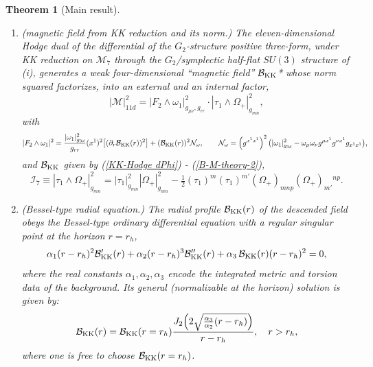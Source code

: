 \documentclass[a4paper,11pt,fleqn]{article}
\theoremstyle{plain}
\newtheorem{theorem}{Theorem}[section]
\theoremstyle{definition}
\newcommand{\Om}{\Omega}
\newcommand{\ta}{\tau}
\newcommand{\Nf}{{\cal B}_{\rm KK}(r)}
\newcommand{\gthree}{g_{3d}}
\newcommand{\grr}{g_{rr}}
\newcommand{\Ical}{\mathcal{I}_7}
\newcommand{\rh}{r_h}
\newcommand{\anu}{\alpha_1}
\newcommand{\ade}{\alpha_2}
\newcommand{\ath}{\alpha_3}
\begin{document}
\begin{theorem}[Main result]
\begin{enumerate}
\item[\textup{(ii)}] \emph{(magnetic field from KK reduction and its norm.)} The eleven-dimensional Hodge dual of the differential of the $G_2$-structure positive three-form, under KK reduction on $\mathcal{M}_7$ through the $G_2$/symplectic
half-flat $SU(3)$ structure of \textup{(i)}, generates a weak four-dimensional ``magnetic field'' ${\cal B}_{\rm KK}$* whose norm squared factorizes, into an external and an internal factor,
\begin{equation}
|\mathcal{M}|^2_{11d}
= |F_2\wedge\omega_1|^2_{g_{\mu\nu},\grr}\cdot
|\ta_1\wedge\Om_+|^2_{g_{mn}},
\label{eq:thm-normfact}
\end{equation}
with
\begin{equation}
|F_2\wedge\omega_1|^2
= \frac{|\omega_1|^2_{\gthree}}{\grr}(x^1)^2\bigl[(\partial_r\Nf)^2\bigr]
+ (\Nf)^2\mathcal{N}_\omega,
\qquad
\mathcal{N}_\omega = \left(g^{x^1x^1}\right)^2\bigl(|\omega_1|^2_{\gthree}
-\omega_\mu\omega_\nu g^{\mu x^1}g^{\nu x^1}g_{x^1x^1}\bigr),
\label{eq:thm-extnorm}
\end{equation}
and ${\cal B}_{\rm KK}$ given by (\ref{KK-Hodge dPhi}) - (\ref{B-M-theory-2}),
\begin{equation}
\Ical \equiv |\ta_1\wedge\Om_+|^2_{g_{mn}}
= |\ta_1|^2_{g_{mn}}|\Om_+|^2_{g_{mn}}
- \tfrac{1}{2}(\ta_1)^m(\ta_1)^{m'}(\Om_+)_{mnp}(\Om_+)_{m'}{}^{np}.
\label{eq:thm-I7def}
\end{equation}

\item[\textup{(iii)}] \emph{(Bessel-type radial equation.)} The radial profile $\mathcal{B}_{\rm KK}(r)$
of the descended field obeys the Bessel-type ordinary differential equation with a regular
singular point at the horizon $r=\rh$,
\begin{equation}
\anu(r-\rh)^2\mathcal{B}_{\rm KK}'(r)
+ \ade(r-\rh)^3\mathcal{B}_{\rm KK}''(r)
+ \ath\,\mathcal{B}_{\rm KK}(r)(r-\rh)^2 = 0,
\label{eq:thm-NeffEOM}
\end{equation}
where the real constants $\anu,\ade,\ath$ encode the integrated metric and torsion data of the
background. Its general (normalizable at the horizon) solution is given by: 
\begin{equation}
\mathcal{B}_{\rm KK}(r) = \mathcal{B}_{\rm KK}(r=r_h)
\frac{J_2\!\left(2\sqrt{\frac{\ath}{\ade}(r-\rh)}\right)}{r - r_h},
\quad r > \rh,
\label{eq:thm-solution}
\end{equation}
where one is free to choose $\mathcal{B}_{\rm KK}(r=r_h)$.
\end{enumerate}
\end{theorem}
\end{document}
